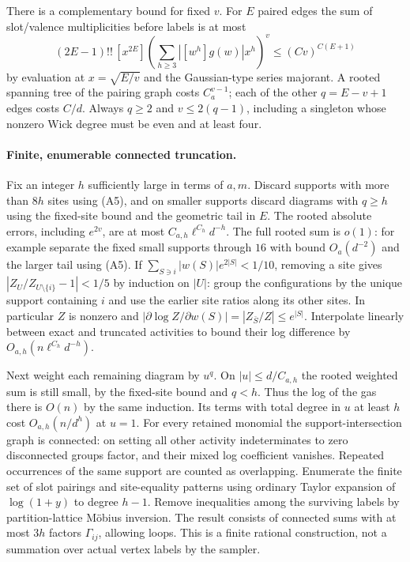 There is a complementary bound for fixed $v$. For $E$ paired edges the sum of slot/valence multiplicities before labels is at most
\[
 (2E-1)!!\,[x^{2E}]\left(\sum_{h\ge3}|[w^h]g(w)|x^h\right)^v
 \le (Cv)^{C(E+1)}
\]
by evaluation at $x=\sqrt{E/v}$ and the Gaussian-type series majorant. A rooted spanning tree of the pairing graph costs $C_a^{v-1}$; each of the other $q=E-v+1$ edges costs $C/d$. Always $q\ge2$ and $v\le2(q-1)$, including a singleton whose nonzero Wick degree must be even and at least four.

\paragraph{Finite, enumerable connected truncation.}
Fix an integer $h$ sufficiently large in terms of $a,m$. Discard supports with more than $8h$ sites using (A5), and on smaller supports discard diagrams with $q\ge h$ using the fixed-site bound and the geometric tail in $E$. The rooted absolute errors, including $e^{2v}$, are at most $C_{a,h}\ell^{C_h}d^{-h}$. The full rooted sum is $o(1)$: for example separate the fixed small supports through $16$ with bound $O_a(d^{-2})$ and the larger tail using (A5). If $\sum_{S\ni i}|w(S)|e^{2|S|}<1/10$, removing a site gives $|Z_U/Z_{U\setminus\{i\}}-1|<1/5$ by induction on $|U|$: group the configurations by the unique support containing $i$ and use the earlier site ratios along its other sites. In particular $Z$ is nonzero and $|\partial\log Z/\partial w(S)|=|Z_{\bar S}/Z|\le e^{|S|}$. Interpolate linearly between exact and truncated activities to bound their log difference by $O_{a,h}(n\ell^{C_h}d^{-h})$.

Next weight each remaining diagram by $u^q$. On $|u|\le d/C_{a,h}$ the rooted weighted sum is still small, by the fixed-site bound and $q<h$. Thus the log of the gas there is $O(n)$ by the same induction. Its terms with total degree in $u$ at least $h$ cost $O_{a,h}(n/d^h)$ at $u=1$. For every retained monomial the support-intersection graph is connected: on setting all other activity indeterminates to zero disconnected groups factor, and their mixed log coefficient vanishes. Repeated occurrences of the same support are counted as overlapping. Enumerate the finite set of slot pairings and site-equality patterns using ordinary Taylor expansion of $\log(1+y)$ to degree $h-1$. Remove inequalities among the surviving labels by partition-lattice M\"obius inversion. The result consists of connected sums with at most $3h$ factors $\Gamma_{ij}$, allowing loops. This is a finite rational construction, not a summation over actual vertex labels by the sampler.

